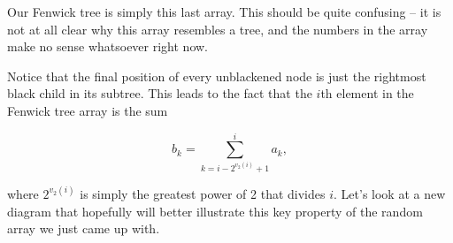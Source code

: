 \documentclass[11pt]{book}
\begin{document}
\begin{center}
{
}
\end{center}

Our Fenwick tree is simply this last array. This should be quite confusing -- it is not at all clear why this array resembles a tree, and the numbers in the array make no sense whatsoever right now.

Notice that the final position of every unblackened node is just the rightmost black child in its subtree. This leads to the fact that the $i$th element in the Fenwick tree array is the sum

\[b_k = \sum_{k=i-2^{v_2(i)}+1}^i a_k, \]

where $2^{v_2(i)}$ is simply the greatest power of 2 that divides $i$. Let's look at a new diagram that hopefully will better illustrate this key property of the random array we just came up with.
\end{document}
